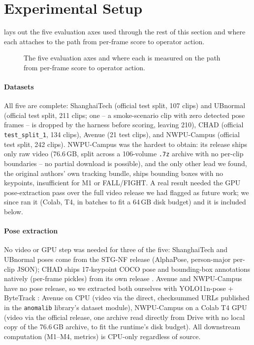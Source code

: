 \documentclass[conference]{IEEEtran}
\begin{document}
\section{Experimental Setup}
\label{sec:setup}

 lays out the five evaluation axes used through the rest
of this section and where each attaches to the path from per-frame score to
operator action.

\begin{figure}[t]
\centering

\caption{The five evaluation axes and where each is measured on the path from
per-frame score to operator action.}
\label{fig:protocol}
\end{figure}

\paragraph{Datasets}
All five are complete: ShanghaiTech \cite{shanghaitech2017} (official test
split, 107 clips) and UBnormal \cite{ubnormal2022} (official test split, 211
clips; one -- a smoke-scenario clip with zero detected pose frames -- is
dropped by the harness before scoring, leaving 210), CHAD \cite{chad2023}
(official \texttt{test\_split\_1}, 134 clips), Avenue \cite{avenue2013} (21
test clips), and NWPU-Campus \cite{nwpu2023} (official test split, 242
clips). NWPU-Campus was the hardest to obtain: its release ships only raw
video (76.6\,GB, split across a 106-volume \texttt{.7z}
archive with no per-clip boundaries -- no partial download is possible), and
the only other lead we found, the original authors' own tracking bundle, ships
bounding boxes with no keypoints, insufficient for M1 or FALL/FIGHT. A real
result needed the GPU pose-extraction pass over the full video release we had
flagged as future work; we since ran it (Colab, T4, in batches to fit a
64\,GB disk budget) and it is included below.

\paragraph{Pose extraction}
No video or GPU step was needed for three of the five: ShanghaiTech and
UBnormal poses come from the STG-NF release \cite{stgnf2023} (AlphaPose,
person-major per-clip JSON); CHAD ships 17-keypoint COCO pose and bounding-box
annotations natively (per-frame pickles) from its own release
\cite{chad2023}. Avenue and NWPU-Campus have no pose release, so we extracted
both ourselves with YOLO11n-pose \cite{ultralytics2023} + ByteTrack
\cite{bytetrack2022}: Avenue on CPU (video via the direct, checksummed URLs
published in the \texttt{anomalib} library's dataset module), NWPU-Campus on
a Colab T4 GPU (video via the official release, one archive read directly
from Drive with no local copy of the 76.6\,GB archive, to fit the runtime's
disk budget). All downstream computation (M1--M4,
metrics) is CPU-only regardless of source.
\end{document}
